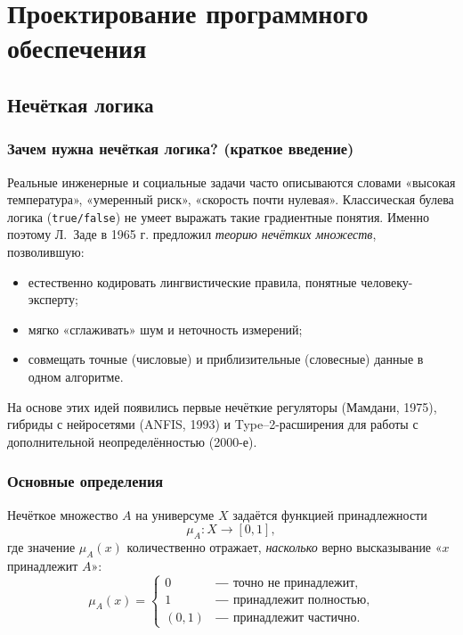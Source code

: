 \section{Проектирование программного обеспечения}


\subsection{Нечёткая логика}

\subsubsection{Зачем нужна нечёткая логика? (краткое введение)}
Реальные инженерные и социальные задачи часто описываются словами  
«высокая температура», «умеренный риск», «скорость почти нулевая».  
Классическая булева логика (\texttt{true/false}) не умеет выражать такие
градиентные понятия.  
Именно поэтому Л.~Заде в 1965 г. предложил \emph{теорию нечётких
множеств}, позволившую:
\begin{itemize}
  \item естественно кодировать лингвистические правила,
        понятные человеку-эксперту;
  \item мягко «сглаживать» шум и неточность измерений;
  \item совмещать точные (числовые) и приблизительные (словесные) данные
        в одном алгоритме.
\end{itemize}
На основе этих идей появились первые нечёткие регуляторы
(Мамдани, 1975), гибриды с нейросетями (ANFIS, 1993) и
Type–2-расширения для работы с дополнительной неопределённостью
(2000-е).

\subsubsection{Основные определения}

\begin{definition}
Нечёткое множество $A$ на универсуме $X$ задаётся функцией принадлежности
\begin{equation}
  \mu_A\colon X \longrightarrow [0,1],
  \label{eq:fuzzy_set_def}
\end{equation}
где значение $\mu_A(x)$ количественно отражает,
\emph{насколько} верно высказывание «$x$ принадлежит $A$»:
\[
  \mu_A(x)=
  \begin{cases}
    0          &\text{― точно не принадлежит},\\
    1          &\text{― принадлежит полностью},\\
    (0,1)      &\text{― принадлежит частично}.
  \end{cases}
\]
\end{definition}

